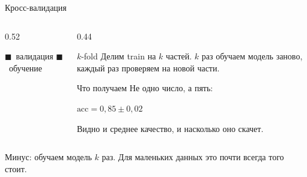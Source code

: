 \begin{frame}[c]{Кросс-валидация}
  \begin{columns}[T]
    \begin{column}{0.52\textwidth}
      \centering

      \smallskip
      {\footnotesize\color{acGray}\textcolor{acOrange}{$\blacksquare$}~валидация \quad
      \textcolor{acLight!80!black}{$\blacksquare$}~обучение\par}
    \end{column}
    \begin{column}{0.44\textwidth}
      \begin{block}{$k$-fold}
        \small
        Делим train на $k$ частей. $k$ раз обучаем модель заново,
        каждый раз проверяем на новой части.
      \end{block}
      \begin{block}{Что получаем}
        \small
        Не одно число, а пять: \\
        \centerline{$\text{acc} = 0{,}85 \pm 0{,}02$}
        Видно и среднее качество, и насколько оно скачет.
      \end{block}
    \end{column}
  \end{columns}

  \medskip
  {\footnotesize\color{acGray}Минус: обучаем модель $k$ раз. Для маленьких данных это почти всегда того стоит.\par}
\end{frame}

